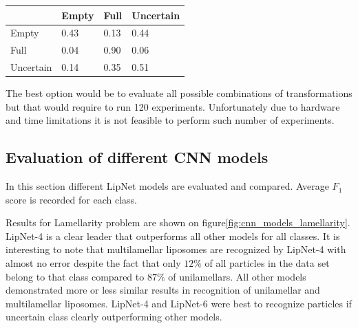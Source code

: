 \documentclass[a4paper, 11pt, table]{article}
\begin{document}
\begin{center}
\label{table:zoom_only}
\begin{tabular}{|L{2.5cm} |C{2.5cm} |C{2.5cm} |C{2.5cm}|}
\toprule
 & Empty & Full & Uncertain \\
\midrule
Empty & 0.43 & 0.13 & 0.44 \\
Full & 0.04 & 0.90 & 0.06 \\
Uncertain & 0.14 & 0.35 & 0.51 \\
\bottomrule
\end{tabular}
\end{center}

The best option would be to evaluate all possible combinations of transformations but that would require to run 120 experiments. Unfortunately due to hardware and time limitations it is not feasible to perform such number of experiments.

\subsection{Evaluation of different CNN models}

In this section different LipNet models are evaluated and compared. Average $F_1$ score is recorded for each class.

Results for Lamellarity problem are shown on figure\ref{fig:cnn_models_lamellarity}. LipNet-4 is a clear leader that outperforms all other models for all classes. It is interesting to note that multilamellar liposomes are recognized by LipNet-4 with almost no error despite the fact that only $12\%$ of all particles in the data set belong to that class compared to $87\%$ of unilamellars. All other models demonstrated more or less similar results in recognition of unilamellar and multilamellar liposomes. LipNet-4 and LipNet-6 were best to recognize particles if uncertain class clearly outperforming other models.
\end{document}
